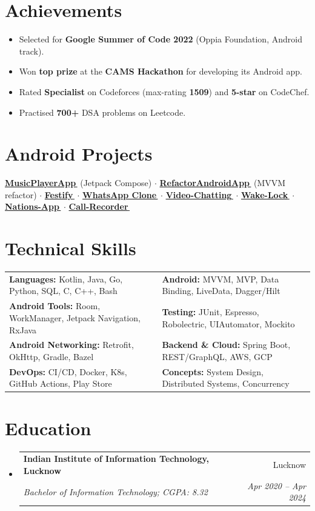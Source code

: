 \documentclass[letterpaper,10pt]{article}
\makeatletter
\let\orighref\href
\renewcommand{\href}[2]{\orighref{#1}{#2\tiny\,\faExternalLink\normalsize}}
\newcommand{\resumeSubheading}[4]{
  \item
    \begin{tabular*}{0.97\textwidth}{l@{\extracolsep{\fill}}r}
      \textbf{#1} & #2 \\
      \textit{\small#3} & \textit{\small #4} \\
    \end{tabular*}
}
\newcommand{\resumeSubHeadingListStart}{\vspace{-4pt}\begin{itemize}[leftmargin=*,itemsep=1pt,parsep=0pt]}
\newcommand{\resumeSubHeadingListEnd}{\end{itemize}}
\makeatother
\begin{document}
\section{Achievements}
\begin{itemize}[leftmargin=*, itemsep=0pt, parsep=0pt]
      \selectfont\small
      \item Selected for \textbf{Google Summer of Code 2022} (Oppia Foundation, Android track).
      \item Won \textbf{top prize} at the \textbf{CAMS Hackathon} for developing its Android app.
      \item Rated \textbf{Specialist} on Codeforces (max-rating \textbf{1509}) and \textbf{5-star} on CodeChef.
      \item Practised \textbf{700+} DSA problems on Leetcode.
\end{itemize}

\section{Android Projects}
\footnotesize
\href{https://github.com/yash10019coder/MusicPlayerApp}{\textbf{MusicPlayerApp}} (Jetpack Compose) $\cdot$
\href{https://github.com/yash10019coder/RefactorAndroidApp}{\textbf{RefactorAndroidApp}} (MVVM refactor) $\cdot$
\href{https://github.com/yash10019coder/festify-android}{\textbf{Festify}} $\cdot$
\href{https://github.com/yash10019coder/Whats-App}{\textbf{WhatsApp Clone}} $\cdot$
\href{https://github.com/yash10019coder/Video-Chatting}{\textbf{Video-Chatting}} $\cdot$
\href{https://github.com/yash10019coder/Wake-Lock}{\textbf{Wake-Lock}} $\cdot$
\href{https://github.com/yash10019coder/Nations-App-MVVM-rxjava-retrofit}{\textbf{Nations-App}} $\cdot$
\href{https://github.com/yash10019coder/Call-Recorder-Android}{\textbf{Call-Recorder}}
%
\section{Technical Skills}
\small
\begin{tabular*}{\textwidth}{l@{\extracolsep{\fill}}l}
  \textbf{Languages:} Kotlin, Java, Go, Python, SQL, C, C++, Bash & \textbf{Android:} MVVM, MVP, Data Binding, LiveData, Dagger/Hilt \\
  \textbf{Android Tools:} Room, WorkManager, Jetpack Navigation, RxJava & \textbf{Testing:} JUnit, Espresso, Robolectric, UIAutomator, Mockito \\
  \textbf{Android Networking:} Retrofit, OkHttp, Gradle, Bazel & \textbf{Backend \& Cloud:} Spring Boot, REST/GraphQL, AWS, GCP \\
  \textbf{DevOps:} CI/CD, Docker, K8s, GitHub Actions, Play Store & \textbf{Concepts:} System Design, Distributed Systems, Concurrency \\
\end{tabular*}

\section{Education}
\resumeSubHeadingListStart
\resumeSubheading
{Indian Institute of Information Technology, Lucknow}{Lucknow}
{Bachelor of Information Technology;  CGPA: 8.32}{Apr 2020 -- Apr 2024}
\resumeSubHeadingListEnd
\end{document}
